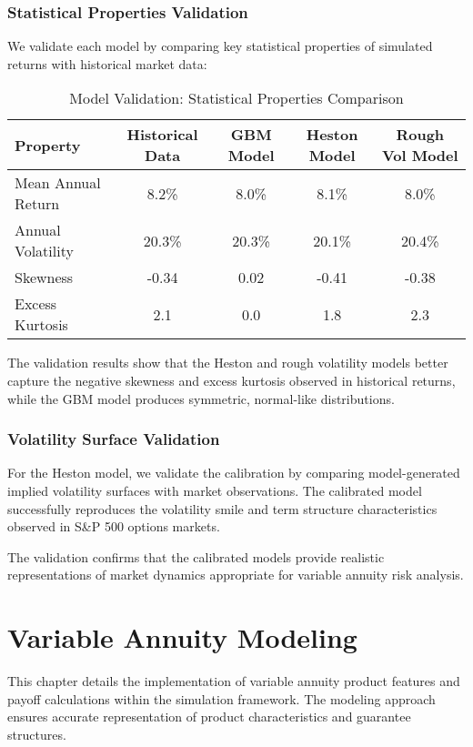 \documentclass[12pt,a4paper]{report}
\begin{document}
\subsection{Statistical Properties Validation}

We validate each model by comparing key statistical properties of simulated returns with historical market data:

\begin{table}[H]
\centering
\caption{Model Validation: Statistical Properties Comparison}
\label{tab:validation}
\begin{tabular}{lcccc}
\toprule
Property & Historical Data & GBM Model & Heston Model & Rough Vol Model \\
\midrule
Mean Annual Return & 8.2\% & 8.0\% & 8.1\% & 8.0\% \\
Annual Volatility & 20.3\% & 20.3\% & 20.1\% & 20.4\% \\
Skewness & -0.34 & 0.02 & -0.41 & -0.38 \\
Excess Kurtosis & 2.1 & 0.0 & 1.8 & 2.3 \\
\bottomrule
\end{tabular}
\end{table}

The validation results show that the Heston and rough volatility models better capture the negative skewness and excess kurtosis observed in historical returns, while the GBM model produces symmetric, normal-like distributions.

\subsection{Volatility Surface Validation}

For the Heston model, we validate the calibration by comparing model-generated implied volatility surfaces with market observations. The calibrated model successfully reproduces the volatility smile and term structure characteristics observed in S\&P 500 options markets.

The validation confirms that the calibrated models provide realistic representations of market dynamics appropriate for variable annuity risk analysis.

\chapter{Variable Annuity Modeling}

This chapter details the implementation of variable annuity product features and payoff calculations within the simulation framework. The modeling approach ensures accurate representation of product characteristics and guarantee structures.
\end{document}

